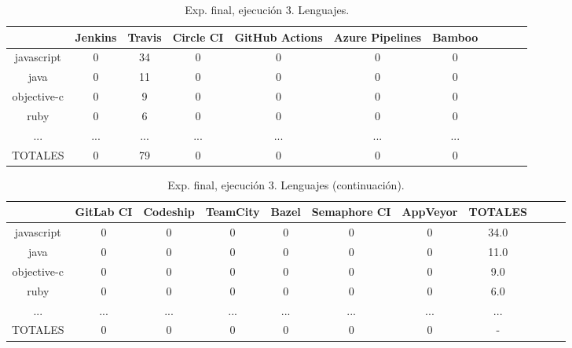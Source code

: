\begin{table}[h]
  \centering
  \caption{Exp. final, ejecución 3. Lenguajes.}
  \label{tab:tabla_f3_2a}

\begin{footnotesize}
\renewcommand{\arraystretch}{1.5} %
\begin{tabular}{ccccccccccc}
  \hline
  {} &  Jenkins &  Travis &  Circle CI &  GitHub Actions &  Azure Pipelines &  Bamboo \\
  \hline
  javascript   &        0 &      34 &          0 &               0 &                0 &       0 \\
  java         &        0 &      11 &          0 &               0 &                0 &       0 \\
  objective-c  &        0 &       9 &          0 &               0 &                0 &       0 \\
  ruby         &        0 &       6 &          0 &               0 &                0 &       0 \\
  ...          &      ... &     ... &        ... &             ... &              ... &     ... \\
  \hline
  TOTALES      &        0 &      79 &          0 &               0 &                0 &       0 \\
 \end{tabular}
\end{footnotesize}

\end{table}

\begin{table}[h]
  \centering
  \caption{Exp. final, ejecución 3. Lenguajes (continuación).}
  \label{tab:tabla_f3_2b}

\begin{footnotesize}
\renewcommand{\arraystretch}{1.5} %
\begin{tabular}{ccccccccccc}
  \hline
  {} &  GitLab CI &  Codeship &  TeamCity &  Bazel &  Semaphore CI &  AppVeyor &  TOTALES \\
  \hline
  javascript   &        0 &         0 &         0 &      0 &             0 &         0 &     34.0 \\
  java         &        0 &         0 &         0 &      0 &             0 &         0 &     11.0 \\
  objective-c  &        0 &         0 &         0 &      0 &             0 &         0 &      9.0 \\
  ruby         &        0 &         0 &         0 &      0 &             0 &         0 &      6.0 \\
  ...          &      ... &       ... &       ... &    ... &           ... &       ... &      ... \\
  \hline
  TOTALES      &        0 &         0 &         0 &      0 &             0 &         0 &        - \\
 \end{tabular}
\end{footnotesize}

\end{table}

